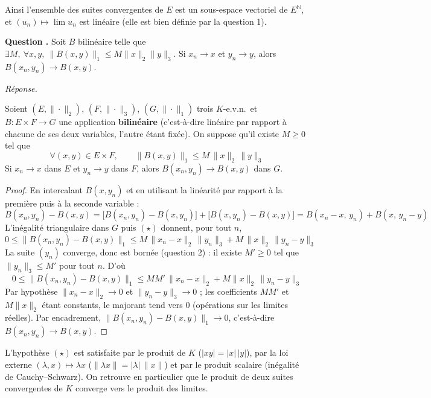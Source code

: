 \documentclass[11pt]{article}
\newcounter{qnum}
\newcommand{\question}[1]{%
\stepcounter{qnum}%
\bigskip
\noindent\textbf{Question \theqnum.} #1\par}
\newcommand{\reponse}{\noindent\textit{Réponse.}\ }
\begin{document}
\begin{remarque}
Ainsi l'ensemble des suites convergentes de $E$ est un sous-espace vectoriel de $E^{\mathbb{N}}$, et $(u_n)\mapsto\lim u_n$ est linéaire (elle est bien définie par la question 1).
\end{remarque}

\question{Soit $B$ bilinéaire telle que $\exists M,\ \forall x,y,\ \|B(x,y)\|_1\leq M\|x\|_2\|y\|_3$. Si $x_n\to x$ et $y_n\to y$, alors $B(x_n,y_n)\to B(x,y)$.}
\reponse

\begin{theo}
\label{theo:bilineaire}
Soient $(E,\|\cdot\|_2)$, $(F,\|\cdot\|_3)$, $(G,\|\cdot\|_1)$ trois $K$-e.v.n.\ et $B:E\times F\to G$ une application \textbf{bilinéaire} (c'est-à-dire linéaire par rapport à chacune de ses deux variables, l'autre étant fixée). On suppose qu'il existe $M\geq 0$ tel que
\[\forall(x,y)\in E\times F,\qquad\|B(x,y)\|_1\leq M\,\|x\|_2\,\|y\|_3\tag{$\star$}\]
Si $x_n\to x$ dans $E$ et $y_n\to y$ dans $F$, alors $B(x_n,y_n)\to B(x,y)$ dans $G$.
\end{theo}

\begin{proof}
En intercalant $B(x,y_n)$ et en utilisant la linéarité par rapport à la première puis à la seconde variable :
\[B(x_n,y_n)-B(x,y)=\big[B(x_n,y_n)-B(x,y_n)\big]+\big[B(x,y_n)-B(x,y)\big]=B(x_n-x,\,y_n)+B(x,\,y_n-y)\]
L'inégalité triangulaire dans $G$ puis $(\star)$ donnent, pour tout $n$,
\[0\leq\big\|B(x_n,y_n)-B(x,y)\big\|_1\leq M\,\|x_n-x\|_2\,\|y_n\|_3+M\,\|x\|_2\,\|y_n-y\|_3\]
La suite $(y_n)$ converge, donc est bornée (question 2) : il existe $M'\geq 0$ tel que $\|y_n\|_3\leq M'$ pour tout $n$. D'où
\[0\leq\big\|B(x_n,y_n)-B(x,y)\big\|_1\leq MM'\,\|x_n-x\|_2+M\|x\|_2\,\|y_n-y\|_3\]
Par hypothèse $\|x_n-x\|_2\to 0$ et $\|y_n-y\|_3\to 0$ ; les coefficients $MM'$ et $M\|x\|_2$ étant constants, le majorant tend vers $0$ (opérations sur les limites réelles). Par encadrement, $\|B(x_n,y_n)-B(x,y)\|_1\to 0$, c'est-à-dire $B(x_n,y_n)\to B(x,y)$.
\end{proof}

\begin{remarque}
L'hypothèse $(\star)$ est satisfaite par le produit de $K$ ($|xy|=|x|\,|y|$), par la loi externe $(\lambda,x)\mapsto\lambda x$ ($\|\lambda x\|=|\lambda|\,\|x\|$) et par le produit scalaire (inégalité de Cauchy--Schwarz). On retrouve en particulier que le produit de deux suites convergentes de $K$ converge vers le produit des limites.
\end{remarque}
\end{document}
